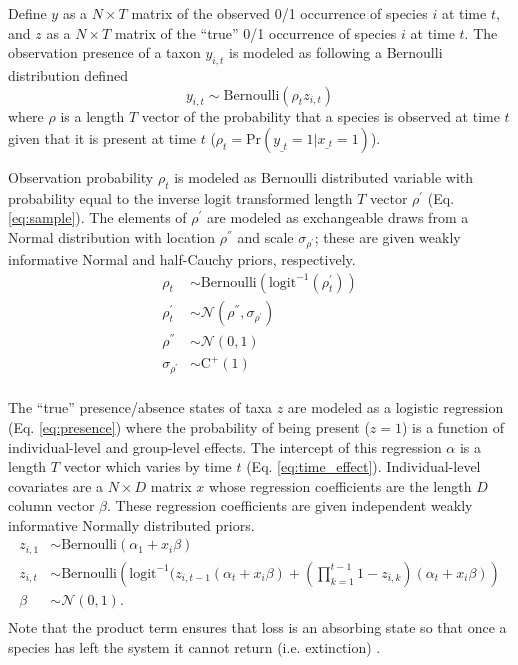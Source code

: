 \documentclass[12pt,letterpaper]{article}
\begin{document}
Define \(y\) as a \(N \times T\) matrix of the observed 0/1 occurrence of species \(i\) at time \(t\), and \(z\) as a \(N \times T\) matrix of the ``true'' 0/1 occurrence of species \(i\) at time \(t\). The observation presence of a taxon \(y_{i,t}\) is modeled as following a Bernoulli distribution defined
\begin{equation}
  y_{i,t} \sim \text{Bernoulli}(\rho_{t} z_{i,t})
  \label{eq:latent}
\end{equation}
where \(\rho\) is a length \(T\) vector of the probability that a species is observed at time \(t\) given that it is present at time \(t\) (\(\rho_{t} = \text{Pr}(y_{\_t} = 1 | x_{\_t} = 1)\)).


Observation probability \(\rho_{t}\) is modeled as Bernoulli distributed variable with probability equal to the inverse logit transformed length \(T\) vector \(\rho^{\prime}\) (Eq. \ref{eq:sample}). The elements of \(\rho^{\prime}\) are modeled as exchangeable draws from a Normal distribution with location \(\rho^{''}\) and scale \(\sigma_{\rho^{\prime}}\); these are given weakly informative Normal and half-Cauchy priors, respectively.
\begin{equation}
  \begin{aligned}
    \rho_{t} &\sim \text{Bernoulli}\left(\text{logit}^{-1}(\rho^{\prime}_{t})\right) \\
    \rho^{\prime}_{t} &\sim \mathcal{N}(\rho^{''}, \sigma_{\rho^{\prime}}) \\
    \rho^{''} &\sim \mathcal{N}(0, 1) \\
    \sigma_{\rho^{\prime}} &\sim \text{C}^{+}(1) \\
  \end{aligned}
  \label{eq:sample}
\end{equation}


The ``true'' presence/absence states of taxa \(z\) are modeled as a logistic regression (Eq. \ref{eq:presence}) where the probability of being present (\(z = 1\)) is a function of individual-level and group-level effects. The intercept of this regression \(\alpha\) is a length \(T\) vector which varies by time \(t\) (Eq. \ref{eq:time_effect}). Individual-level covariates are a \(N \times D\) matrix \(x\) whose regression coefficients are the length \(D\) column vector \(\beta\). These regression coefficients are given independent weakly informative Normally distributed priors. 
\begin{equation}
  \begin{aligned}
    z_{i,1} &\sim \text{Bernoulli}(\alpha_{1} + x_{i} \beta) \\
    z_{i,t} &\sim \text{Bernoulli}\left(\text{logit}^{-1}(z_{i,t-1} (\alpha_{t} + x_{i} \beta) + \left(\prod_{k = 1}^{t-1} 1 - z_{i,k}\right) (\alpha_{t} + x_{i} \beta)\right) \\
    \beta &\sim \mathcal{N}(0, 1). \\
  \end{aligned}
  \label{eq:presence}
\end{equation}
Note that the product term ensures that loss is an absorbing state so that once a species has left the system it cannot return (i.e. extinction) \citep{Royle2008}.
\end{document}
